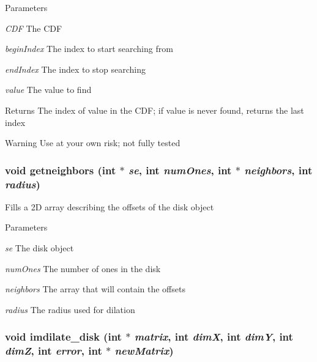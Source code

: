 \begin{DoxyParams}{Parameters}
\item[{\em CDF}]The CDF \item[{\em beginIndex}]The index to start searching from \item[{\em endIndex}]The index to stop searching \item[{\em value}]The value to find \end{DoxyParams}
\begin{DoxyReturn}{Returns}
The index of value in the CDF; if value is never found, returns the last index 
\end{DoxyReturn}
\begin{DoxyWarning}{Warning}
Use at your own risk; not fully tested 
\end{DoxyWarning}
\hypertarget{ex__particle__CUDA__float_8cu_a0c00166a71eba29cbfd8caf24c68c0d5}{
\subsubsection[{getneighbors}]{\setlength{\rightskip}{0pt plus 5cm}void getneighbors (int $\ast$ {\em se}, \/  int {\em numOnes}, \/  int $\ast$ {\em neighbors}, \/  int {\em radius})}}
\label{ex__particle__CUDA__float_8cu_a0c00166a71eba29cbfd8caf24c68c0d5}
Fills a 2D array describing the offsets of the disk object 
\begin{DoxyParams}{Parameters}
\item[{\em se}]The disk object \item[{\em numOnes}]The number of ones in the disk \item[{\em neighbors}]The array that will contain the offsets \item[{\em radius}]The radius used for dilation \end{DoxyParams}
\hypertarget{ex__particle__CUDA__float_8cu_a707e839d9152f9bf820dee64c6627f5b}{
\subsubsection[{imdilate\_\-disk}]{\setlength{\rightskip}{0pt plus 5cm}void imdilate\_\-disk (int $\ast$ {\em matrix}, \/  int {\em dimX}, \/  int {\em dimY}, \/  int {\em dimZ}, \/  int {\em error}, \/  int $\ast$ {\em newMatrix})}}
